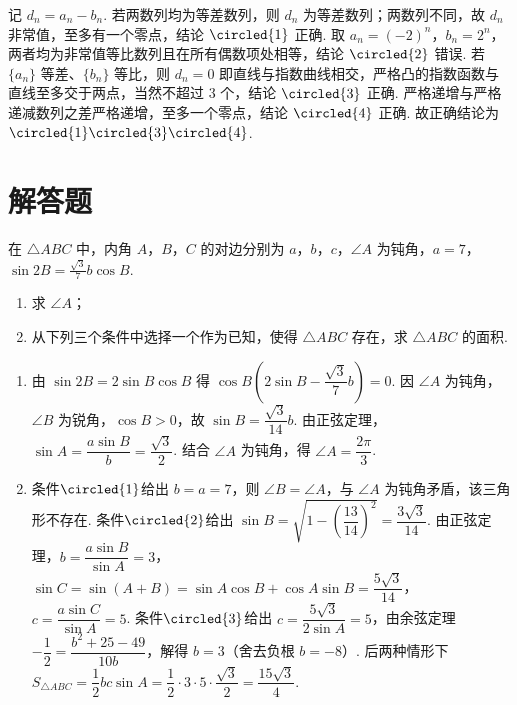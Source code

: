 \begin{solution}
记 \(d_n=a_n-b_n\). 若两数列均为等差数列，则 \(d_n\) 为等差数列；两数列不同，故 \(d_n\) 非常值，至多有一个零点，结论 \(\circled{1}\) 正确. 取 \(a_n=(-2)^n\)，\(b_n=2^n\)，两者均为非常值等比数列且在所有偶数项处相等，结论 \(\circled{2}\) 错误. 若 \(\{a_n\}\) 等差、\(\{b_n\}\) 等比，则 \(d_n=0\) 即直线与指数曲线相交，严格凸的指数函数与直线至多交于两点，当然不超过 \(3\) 个，结论 \(\circled{3}\) 正确. 严格递增与严格递减数列之差严格递增，至多一个零点，结论 \(\circled{4}\) 正确. 故正确结论为 \(\circled{1}\circled{3}\circled{4}\).
\end{solution}

\section{解答题}

\begin{problem}
在 \(\triangle ABC\) 中，内角 \(A\)，\(B\)，\(C\) 的对边分别为 \(a\)，\(b\)，\(c\)，\(\angle A\) 为钝角，\(a=7\)，\(\sin 2B=\frac{\sqrt{3}}{7}b\cos B\).

\begin{enumerate}
\item 求 \(\angle A\)；
\item 从下列三个条件中选择一个作为已知，使得 \(\triangle ABC\) 存在，求 \(\triangle ABC\) 的面积.
\end{enumerate}
\end{problem}

\begin{solution}
\begin{enumerate}
\item 由 \(\sin2B=2\sin B\cos B\) 得 \(\cos B\left(2\sin B-\dfrac{\sqrt3}{7}b\right)=0\). 因 \(\angle A\) 为钝角，\(\angle B\) 为锐角，\(\cos B>0\)，故 \(\sin B=\dfrac{\sqrt3}{14}b\). 由正弦定理，\(\sin A=\dfrac{a\sin B}{b}=\dfrac{\sqrt3}{2}\). 结合 \(\angle A\) 为钝角，得 \(\angle A=\dfrac{2\pi}{3}\).
\item 条件\(\circled{1}\)给出 \(b=a=7\)，则 \(\angle B=\angle A\)，与 \(\angle A\) 为钝角矛盾，该三角形不存在. 条件\(\circled{2}\)给出 \(\sin B=\sqrt{1-\left(\dfrac{13}{14}\right)^2}=\dfrac{3\sqrt3}{14}\). 由正弦定理，\(b=\dfrac{a\sin B}{\sin A}=3\)，\(\sin C=\sin(A+B)=\sin A\cos B+\cos A\sin B=\dfrac{5\sqrt3}{14}\)，\(c=\dfrac{a\sin C}{\sin A}=5\). 条件\(\circled{3}\)给出 \(c=\dfrac{5\sqrt3}{2\sin A}=5\)，由余弦定理 \(-\dfrac12=\dfrac{b^2+25-49}{10b}\)，解得 \(b=3\)（舍去负根 \(b=-8\)）. 后两种情形下 \(S_{\triangle ABC}=\dfrac12bc\sin A=\dfrac12\cdot3\cdot5\cdot\dfrac{\sqrt3}{2}=\dfrac{15\sqrt3}{4}\).
\end{enumerate}
\end{solution}

